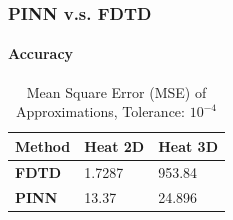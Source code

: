 \begin{frame}
  \frametitle{PINN v.s. FDTD}
  \framesubtitle{Accuracy}

  \begin{table}
    \caption{Mean Square Error (MSE) of Approximations, Tolerance: $10^{-4}$}
    \begin{center}
      \footnotesize
      \begin{tabular}{p{1.5cm} p{1.5cm} p{1.5cm}}
        \toprule
        \bfseries Method  & \bfseries Heat 2D      & \bfseries Heat 3D         \\
        \midrule 
        \bfseries FDTD    & 1.7287  & 953.84 \\
        \bfseries PINN    & 13.37   & 24.896 \\
        \bottomrule 
      \end{tabular}
    \end{center}
  \end{table}



\end{frame}
